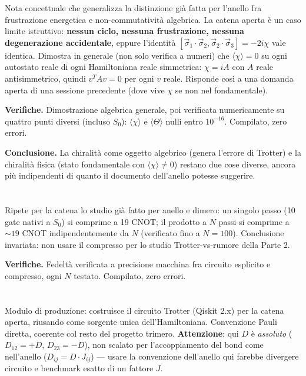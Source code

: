 \documentclass[11pt,a4paper]{article}
\begin{document}
Nota concettuale che generalizza la distinzione già fatta per l'anello fra
frustrazione energetica e non-commutatività algebrica. La catena aperta è
un caso limite istruttivo: \textbf{nessun ciclo, nessuna frustrazione,
nessuna degenerazione accidentale}, eppure l'identità
$[\vec\sigma_1\!\cdot\!\vec\sigma_2,\vec\sigma_2\!\cdot\!\vec\sigma_3]=-2i\chi$
vale identica. Dimostra in generale (non solo verifica a numeri) che
$\langle\chi\rangle=0$ su ogni autostato reale di ogni Hamiltoniana reale
simmetrica: $\chi=iA$ con $A$ reale antisimmetrico, quindi $v^TAv=0$ per
ogni $v$ reale. Risponde così a una domanda aperta di una sessione
precedente (dove vive $\chi$ se non nel fondamentale).

\textbf{Verifiche.} Dimostrazione algebrica generale, poi verificata
numericamente su quattro punti diversi (incluso $S_0$): $\langle\chi\rangle$
e $\langle\Theta\rangle$ nulli entro $10^{-16}$. Compilato, zero errori.

\textbf{Conclusione.} La chiralità come oggetto algebrico (genera l'errore
di Trotter) e la chiralità fisica (stato fondamentale con
$\langle\chi\rangle\neq0$) restano due cose diverse, ancora più indipendenti
di quanto il documento dell'anello potesse suggerire.

\section*{\texttt{}}

Ripete per la catena lo studio già fatto per anello e dimero: un singolo
passo (10 gate nativi a $S_0$) si comprime a 19 CNOT; il prodotto a $N$
passi si comprime a $\sim19$ CNOT indipendentemente da $N$ (verificato
fino a $N=100$). Conclusione invariata: non usare il compresso per lo
studio Trotter-vs-rumore della Parte 2.

\textbf{Verifiche.} Fedeltà verificata a precisione macchina fra
circuito esplicito e compresso, ogni $N$ testato. Compilato, zero errori.

\section*{\texttt{}}

Modulo di produzione: costruisce il circuito Trotter (Qiskit 2.x) per la catena
aperta, riusando \texttt{} come sorgente unica
dell'Hamiltoniana. Convenzione Pauli diretta, coerente col resto del progetto
trimero. \textbf{Attenzione}: qui $D$ è \emph{assoluto} ($D_{12}{=}{+}D$,
$D_{23}{=}{-}D$), non scalato per l'accoppiamento del bond come nell'anello
($D_{ij}=D\cdot J_{ij}$) — usare la convenzione dell'anello qui farebbe divergere
circuito e benchmark esatto di un fattore $J$.
\end{document}
